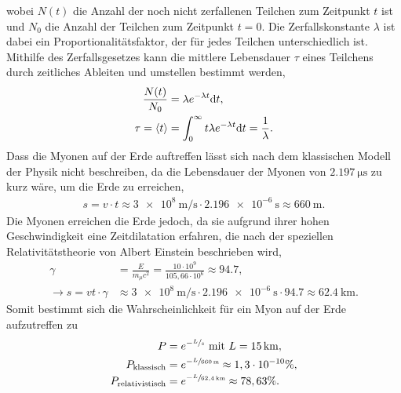 wobei $N(t)$ die Anzahl der noch nicht zerfallenen Teilchen zum Zeitpunkt $t$ ist und $N_0$ die Anzahl der Teilchen zum Zeitpunkt $t=0$.
Die Zerfallskonstante $\lambda$ ist dabei ein Proportionalitätsfaktor, der für jedes Teilchen unterschiedlich ist.
Mithilfe des Zerfallsgesetzes kann die mittlere Lebensdauer $\tau$ eines Teilchens durch zeitliches Ableiten und umstellen bestimmt werden,
\begin{align}
    \frac{N(t)}{N_0}&=\lambda e^{-\lambda t}\text dt, \\
    \tau = \braket t &= \int_0^\infty t\lambda e^{-\lambda t}\text dt = \frac{1}{\lambda}.
\end{align}
Dass die Myonen auf der Erde auftreffen lässt sich nach dem klassischen Modell der Physik nicht beschreiben, da die Lebensdauer der Myonen von $\SI{2.197}{\micro\second}$ zu kurz wäre, um die Erde zu erreichen,
\begin{align*}
    s = v\cdot t\approx \SI{3e8}{\meter\per\second}\cdot \SI{2,196e-6}{\second}\approx \SI{660}{\meter}.
\end{align*}
Die Myonen erreichen die Erde jedoch, da sie aufgrund ihrer hohen Geschwindigkeit eine Zeitdilatation erfahren, die nach der speziellen Relativitätstheorie von Albert Einstein beschrieben wird,
\begin{align*}
    \gamma &= \frac{E}{m_\mu c^2} = \frac{10\cdot 10^9}{105,66\cdot 10^6}\approx94.7, \\
    \rightarrow s = vt\cdot\gamma&\approx \SI{3e8}{\meter\per\second}\cdot \SI{2.196e-6}{\second} \cdot 94.7\approx \SI{62.4}{\kilo\meter}.
\end{align*}
Somit bestimmt sich die Wahrscheinlichkeit für ein Myon auf der Erde aufzutreffen zu
\begin{align*}
    P&=e^{-\sfrac{L}{s}}\ \text{mit}\ L=\SI{15}{\kilo\meter}, \\
    P_{\text{klassisch}} &= e^{-\sfrac{L}{\SI{660}{\meter}}}\approx 1,3\cdot 10^{-10}\%, \\
    P_{\text{relativistisch}} &= e^{-\sfrac{L}{\SI{62.4}{\kilo\meter}}}\approx 78,63\%.
\end{align*}